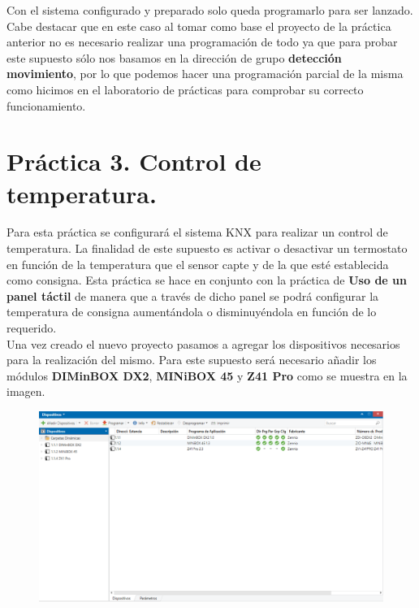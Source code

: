 \documentclass[10pt]{article}
\begin{document}
Con el sistema configurado y preparado solo queda programarlo para ser lanzado. Cabe destacar que en este caso al tomar como base el proyecto de la práctica anterior no es necesario realizar una programación de todo ya que para probar este supuesto sólo nos basamos en la dirección de grupo \textbf{detección movimiento}, por lo que podemos hacer una programación parcial de la misma como hicimos en el laboratorio de prácticas para comprobar su correcto funcionamiento.\\


\section{Práctica 3. Control de temperatura.} 
Para esta práctica se configurará el sistema KNX para realizar un control de temperatura. La finalidad de este supuesto es activar o desactivar un termostato en función de la temperatura que el sensor capte y de la que esté establecida como consigna. Esta práctica se hace en conjunto con la práctica de \textbf{Uso de un panel táctil} de manera que a través de dicho panel se podrá configurar la temperatura de consigna aumentándola o disminuyéndola en función de lo requerido. \\

Una vez creado el nuevo proyecto pasamos a agregar los dispositivos necesarios para la realización del mismo. Para este supuesto será necesario añadir los módulos \textbf{DIMinBOX DX2}, \textbf{MINiBOX 45} y \textbf{Z41 Pro} como se muestra en la imagen. \\

\begin{figure}[H]
	\begin{center}
	 		\includegraphics[width = 1.00\textwidth]{Imagenes/img19}
	\end{center} 
\end{figure}
\end{document}
